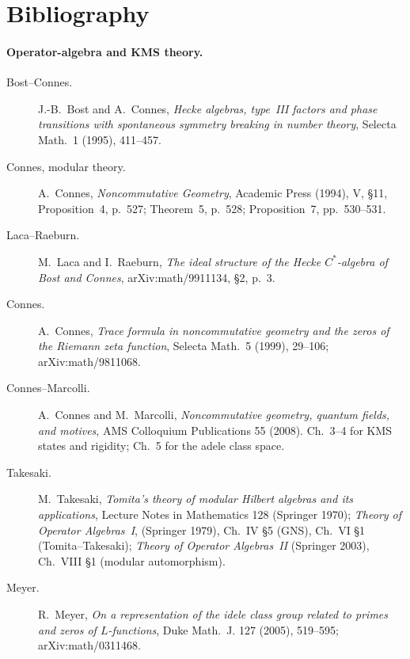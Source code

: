 \section{Bibliography}
\label{v4-arith:w5-b:biblio}

\paragraph{Operator-algebra and KMS theory.}
\begin{description}
\item[Bost--Connes.] J.-B.~Bost and A.~Connes, \emph{Hecke algebras,
type~III factors and phase transitions with spontaneous symmetry
breaking in number theory}, Selecta Math.~1 (1995), 411--457.
\item[Connes, modular theory.] A.~Connes, \emph{Noncommutative Geometry},
Academic Press (1994), V, \S11, Proposition~4, p.~527;
Theorem~5, p.~528; Proposition~7, pp.~530--531.
\item[Laca--Raeburn.] M.~Laca and I.~Raeburn,
\emph{The ideal structure of the Hecke $C^*$-algebra of Bost and Connes},
arXiv:math/9911134, \S2, p.~3.
\item[Connes.] A.~Connes, \emph{Trace formula in noncommutative
geometry and the zeros of the Riemann zeta function}, Selecta
Math.~5 (1999), 29--106; arXiv:math/9811068.
\item[Connes--Marcolli.] A.~Connes and M.~Marcolli, \emph{Noncommutative
geometry, quantum fields, and motives}, AMS Colloquium Publications
55 (2008). Ch.~3--4 for KMS states and rigidity; Ch.~5 for the
adele class space.
\item[Takesaki.] M.~Takesaki, \emph{Tomita's theory of modular
Hilbert algebras and its applications}, Lecture Notes in Mathematics
128 (Springer 1970); \emph{Theory of Operator Algebras~I}, (Springer
1979), Ch.~IV \S5 (GNS), Ch.~VI \S1 (Tomita--Takesaki); \emph{Theory
of Operator Algebras~II} (Springer 2003), Ch.~VIII \S1 (modular
automorphism).
\item[Meyer.] R.~Meyer, \emph{On a representation of the idele class
group related to primes and zeros of \(L\)-functions}, Duke Math.~J.
127 (2005), 519--595; arXiv:math/0311468.
\end{description}

